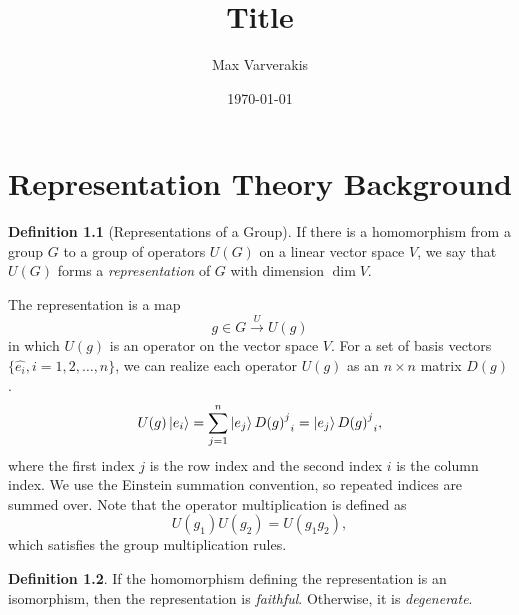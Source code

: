 \documentclass[12pt]{report}
\title{
{Title}\\
}
\author{Max Varverakis}
\date{\today}
\theoremstyle{definition}
\newtheorem{definition}{Definition}[chapter]
\begin{document}
\maketitle

\chapter{Representation Theory Background}

\begin{definition}[Representations of a Group]
    If there is a homomorphism from a group $G$ to a group of operators $U(G)$ on a linear vector space $V$, we say that $U(G)$ forms a \textit{representation} of $G$ with dimension $\dim V$.
\end{definition}

The representation is a map
\begin{equation}
    g\in G\xrightarrow{U} U(g)
\end{equation}
in which $U(g)$ is an operator on the vector space $V$. For a set of basis vectors $\{\hat{e_i},i=1,2,\dots,n\}$, we can realize each operator $U(g)$ as an $n\times n$ matrix $D(g)$.
\begin{equation}
    U(g)\ket{e_i} = \sum_{j=1}^n \ket{e_j}{{D(g)}^j}_i = \ket{e_j}{{D(g)}^j}_i,
\end{equation}
where the first index $j$ is the row index and the second index $i$ is the column index. We use the Einstein summation convention, so repeated indices are summed over. Note that the operator multiplication is defined as
\begin{equation}
    U(g_1)U(g_2) = U(g_1g_2),
\end{equation}
which satisfies the group multiplication rules.

\begin{definition}
    If the homomorphism defining the representation is an isomorphism, then the representation is \textit{faithful}. Otherwise, it is \textit{degenerate}.
\end{definition}
\end{document}
